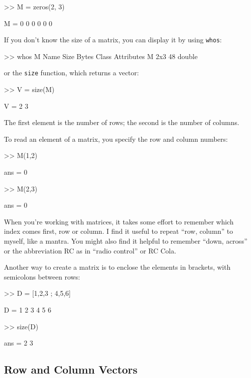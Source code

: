 \begin{code}
>> M = zeros(2, 3)

M =  0     0     0
     0     0     0
\end{code}

If you don't know the size of a matrix, you can display it by using \lstinline{whos}:

\begin{code}
>> whos M
  Name      Size            Bytes  Class     Attributes
  M         2x3                48  double
\end{code}
or the \lstinline{size} function, which returns a vector:


\begin{code}
>> V = size(M)

V = 2    3
\end{code}

The first element is the number of rows; the second is the number of
columns.


To read an element of a matrix, you specify the row and column \mbox{numbers}:

\begin{code}
>> M(1,2)

ans = 0

>> M(2,3)

ans = 0
\end{code}

When you're working with matrices, it takes some effort to remember
which index comes first, row or column.  I find it useful to repeat
``row, column'' to myself, like a mantra.  You might also find it
helpful to remember ``down, across'' or the abbreviation RC as in ``radio control'' or RC Cola.

Another way to create a matrix is to enclose the elements in
brackets, with semicolons between rows:

\begin{code}
>> D = [1,2,3 ; 4,5,6]

D =  1     2     3
     4     5     6

>> size(D)

ans = 2     3
\end{code}


\subsection{Row and Column Vectors}
\label{rowvector}

